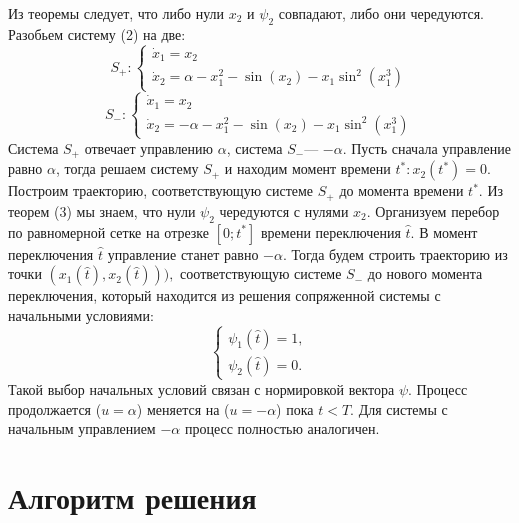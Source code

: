 \documentclass{article}
\theoremstyle{definition}
\begin{document}
 	{Из теоремы следует, что либо нули $x_2$ и $\psi_2$ совпадают, либо они чередуются. Разобьем систему (2) на две:}
 	\begin{equation}
 		S_+ : \begin{cases}
 		\dot{x}_1 = x_2\\
 		\dot{x}_2 =  \alpha - x_1^2 - \sin(x_2) - x_1\sin^2(x_1^3)
 		\end{cases}
 	\end{equation}
 	\begin{equation}
 		S_- : \begin{cases}
 		\dot{x}_1 = x_2\\
 		\dot{x}_2 =  -\alpha - x_1^2 - \sin(x_2) - x_1\sin^2(x_1^3)
 		\end{cases}
 	\end{equation}
 	{Система $S_+$ отвечает управлению $\alpha$, система $S_-$--- $-\alpha.$ }
 	\newline
 	{Пусть сначала управление равно $\alpha$, тогда решаем систему $S_+$ и находим момент времени $t^*:x_2(t^*)=0.$ Построим траекторию, соответствующую системе $S_+$ до момента времени $t^*$. Из теорем (3) мы знаем, что нули $\psi_2$ чередуются с нулями $x_2$. Организуем перебор по равномерной сетке на отрезке $[0; t^*]$ времени переключения $\hat{t}$. В момент переключения $\hat{t}$ управление станет равно $-\alpha.$ Тогда будем строить траекторию из точки $(x_1(\hat{t}),x_2(\hat{t}))),$ соответствующую системе $S_-$ до нового момента переключения, который находится из решения сопряженной системы с начальными условиями:}
 	\begin{equation}
 	\begin{cases}
  	\psi_1(\hat{t}) = 1,\\
 	\psi_2(\hat{t}) = 0.
 	\end{cases}
 	\end{equation}
 	{Такой выбор начальных условий связан с нормировкой вектора $\psi$. Процесс продолжается ($u = \alpha$) меняется на ($u = -\alpha$) пока $t < T.$ Для системы с начальным управлением $-\alpha$ процесс полностью аналогичен.}
 	{\section{Алгоритм решения}}
\end{document}
